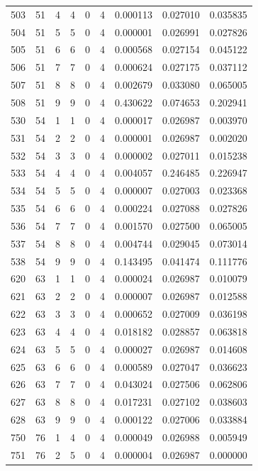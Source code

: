 \begin{longtable}{rrrrrrrrr}
503 & 51 & 4 & 4 & 0 & 4 & 0.000113 & 0.027010 & 0.035835 \\
504 & 51 & 5 & 5 & 0 & 4 & 0.000001 & 0.026991 & 0.027826 \\
505 & 51 & 6 & 6 & 0 & 4 & 0.000568 & 0.027154 & 0.045122 \\
506 & 51 & 7 & 7 & 0 & 4 & 0.000624 & 0.027175 & 0.037112 \\
507 & 51 & 8 & 8 & 0 & 4 & 0.002679 & 0.033080 & 0.065005 \\
508 & 51 & 9 & 9 & 0 & 4 & 0.430622 & 0.074653 & 0.202941 \\
530 & 54 & 1 & 1 & 0 & 4 & 0.000017 & 0.026987 & 0.003970 \\
531 & 54 & 2 & 2 & 0 & 4 & 0.000001 & 0.026987 & 0.002020 \\
532 & 54 & 3 & 3 & 0 & 4 & 0.000002 & 0.027011 & 0.015238 \\
533 & 54 & 4 & 4 & 0 & 4 & 0.004057 & 0.246485 & 0.226947 \\
534 & 54 & 5 & 5 & 0 & 4 & 0.000007 & 0.027003 & 0.023368 \\
535 & 54 & 6 & 6 & 0 & 4 & 0.000224 & 0.027088 & 0.027826 \\
536 & 54 & 7 & 7 & 0 & 4 & 0.001570 & 0.027500 & 0.065005 \\
537 & 54 & 8 & 8 & 0 & 4 & 0.004744 & 0.029045 & 0.073014 \\
538 & 54 & 9 & 9 & 0 & 4 & 0.143495 & 0.041474 & 0.111776 \\
620 & 63 & 1 & 1 & 0 & 4 & 0.000024 & 0.026987 & 0.010079 \\
621 & 63 & 2 & 2 & 0 & 4 & 0.000007 & 0.026987 & 0.012588 \\
622 & 63 & 3 & 3 & 0 & 4 & 0.000652 & 0.027009 & 0.036198 \\
623 & 63 & 4 & 4 & 0 & 4 & 0.018182 & 0.028857 & 0.063818 \\
624 & 63 & 5 & 5 & 0 & 4 & 0.000027 & 0.026987 & 0.014608 \\
625 & 63 & 6 & 6 & 0 & 4 & 0.000589 & 0.027047 & 0.036623 \\
626 & 63 & 7 & 7 & 0 & 4 & 0.043024 & 0.027506 & 0.062806 \\
627 & 63 & 8 & 8 & 0 & 4 & 0.017231 & 0.027102 & 0.038603 \\
628 & 63 & 9 & 9 & 0 & 4 & 0.000122 & 0.027006 & 0.033884 \\
750 & 76 & 1 & 4 & 0 & 4 & 0.000049 & 0.026988 & 0.005949 \\
751 & 76 & 2 & 5 & 0 & 4 & 0.000004 & 0.026987 & 0.000000 \\

\end{longtable}
